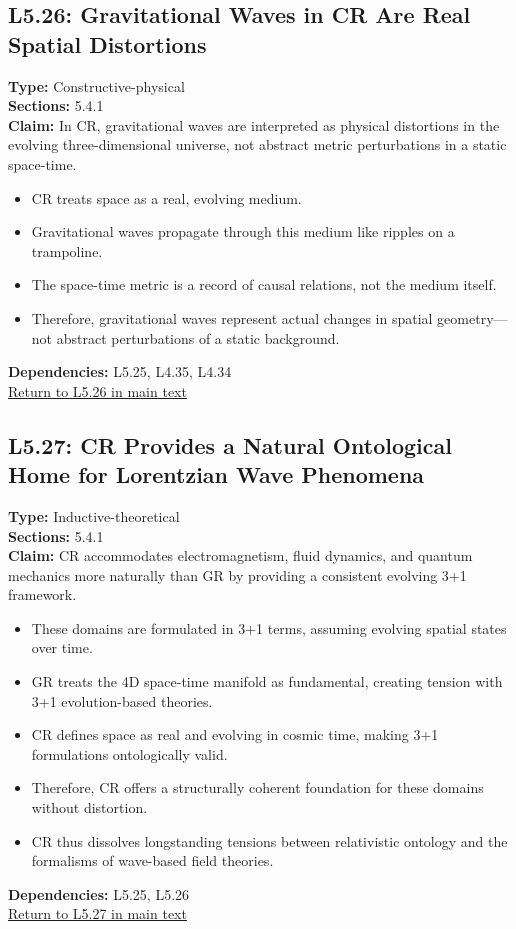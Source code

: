 \documentclass[12pt]{book}
\newcommand{\returnlink}[1]{\hyperref[logic:#1]{Return to #1 in main text}\xspace}
\begin{document}
\subsection*{L5.26: Gravitational Waves in CR Are Real Spatial Distortions}
\label{appendix:L5.26}
\textbf{Type:} Constructive-physical \\
\textbf{Sections:} 5.4.1 \\
\textbf{Claim:} In CR, gravitational waves are interpreted as physical distortions in the evolving three-dimensional universe, not abstract metric perturbations in a static space-time.
\begin{itemize}
  \item CR treats space as a real, evolving medium.
  \item Gravitational waves propagate through this medium like ripples on a trampoline.
  \item The space-time metric is a record of causal relations, not the medium itself.
  \item Therefore, gravitational waves represent actual changes in spatial geometry---not abstract perturbations of a static background.
\end{itemize}
\textbf{Dependencies:} L5.25, L4.35, L4.34 \\
\returnlink{L5.26}

\subsection*{L5.27: CR Provides a Natural Ontological Home for Lorentzian Wave Phenomena}
\label{appendix:L5.27}
\textbf{Type:} Inductive-theoretical \\
\textbf{Sections:} 5.4.1 \\
\textbf{Claim:} CR accommodates electromagnetism, fluid dynamics, and quantum mechanics more naturally than GR by providing a consistent evolving 3+1 framework.
\begin{itemize}
  \item These domains are formulated in 3+1 terms, assuming evolving spatial states over time.
  \item GR treats the 4D space-time manifold as fundamental, creating tension with 3+1 evolution-based theories.
  \item CR defines space as real and evolving in cosmic time, making 3+1 formulations ontologically valid.
  \item Therefore, CR offers a structurally coherent foundation for these domains without distortion.
  \item CR thus dissolves longstanding tensions between relativistic ontology and the formalisms of wave-based field theories.
\end{itemize}
\textbf{Dependencies:} L5.25, L5.26 \\
\returnlink{L5.27}
\end{document}
